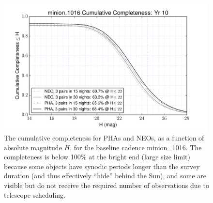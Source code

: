 \begin{figure}[t!]
\centering
\includegraphics[width=0.99\textwidth]{figures/minion_1016_CumulativeCompleteness_NEO_and_PHA_Cumulative_Completeness}
\vskip -0.2in
\caption{The cumulative completeness for PHAs and NEOs, as a function of absolute magnitude $H$, for the baseline
cadence minion\_1016. The completeness is below 100\% at the bright end (large size limit) because some objects have
synodic periods longer than the survey duration (and thus effectively ``hide'' behind the Sun), and some are visible but
 do not receive the required number of observations due to telescope scheduling. \label{fig:minionC1}}
\end{figure}


